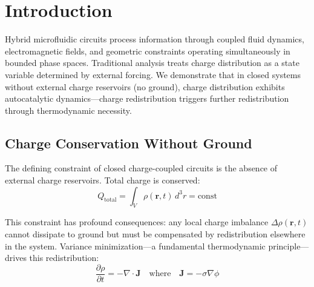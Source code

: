 \documentclass[12pt,a4paper]{article}
\theoremstyle{plain}
\theoremstyle{definition}
\theoremstyle{remark}
\begin{document}
\begin{abstract}
The framework establishes that circuit identity is not intrinsic but emerges from charge distribution context and meta-recognition within naming systems. All results are validated through computational experiments on synthetic charge-coupled circuits.

\textbf{Keywords:} charge-coupled circuits, autocatalytic redistribution, hierarchical depth, identity persistence, subsystem replacement, charge distribution continuity, dissipation transitions, naming circuits, circular validation, meta-recognition
\end{abstract}

\tableofcontents
\newpage

\section{Introduction}
\label{sec:introduction}

Hybrid microfluidic circuits process information through coupled fluid dynamics, electromagnetic fields, and geometric constraints operating simultaneously in bounded phase spaces. Traditional analysis treats charge distribution as a state variable determined by external forcing. We demonstrate that in closed systems without external charge reservoirs (no ground), charge distribution exhibits autocatalytic dynamics—charge redistribution triggers further redistribution through thermodynamic necessity.

\subsection{Charge Conservation Without Ground}

The defining constraint of closed charge-coupled circuits is the absence of external charge reservoirs. Total charge is conserved:
\begin{equation}
Q_{\text{total}} = \int_V \rho(\mathbf{r},t) \, d^3r = \text{const}
\label{eq:charge_conservation}
\end{equation}

This constraint has profound consequences: any local charge imbalance $\Delta \rho(\mathbf{r},t)$ cannot dissipate to ground but must be compensated by redistribution elsewhere in the system. Variance minimization—a fundamental thermodynamic principle—drives this redistribution:
\begin{equation}
\frac{\partial \rho}{\partial t} = -\nabla \cdot \mathbf{J} \quad \text{where} \quad \mathbf{J} = -\sigma \nabla \phi
\end{equation}
\end{document}
